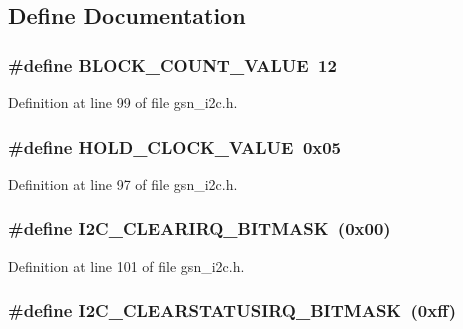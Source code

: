 \subsection{Define Documentation}
\hypertarget{a00516_aadd6c6fc61177e3aa132d309515f93fb}{
\subsubsection[{BLOCK\_\-COUNT\_\-VALUE}]{\setlength{\rightskip}{0pt plus 5cm}\#define BLOCK\_\-COUNT\_\-VALUE~12}}
\label{a00516_aadd6c6fc61177e3aa132d309515f93fb}


Definition at line 99 of file gsn\_\-i2c.h.

\hypertarget{a00516_a8d74e4c372da075d89cf1f067a056368}{
\subsubsection[{HOLD\_\-CLOCK\_\-VALUE}]{\setlength{\rightskip}{0pt plus 5cm}\#define HOLD\_\-CLOCK\_\-VALUE~0x05}}
\label{a00516_a8d74e4c372da075d89cf1f067a056368}


Definition at line 97 of file gsn\_\-i2c.h.

\hypertarget{a00516_aed890941c63a6b5ffef9e6d6858287f8}{
\subsubsection[{I2C\_\-CLEARIRQ\_\-BITMASK}]{\setlength{\rightskip}{0pt plus 5cm}\#define I2C\_\-CLEARIRQ\_\-BITMASK~(0x00)}}
\label{a00516_aed890941c63a6b5ffef9e6d6858287f8}


Definition at line 101 of file gsn\_\-i2c.h.

\hypertarget{a00516_a58947b4668e625ae55a8e9f3648ad78d}{
\subsubsection[{I2C\_\-CLEARSTATUSIRQ\_\-BITMASK}]{\setlength{\rightskip}{0pt plus 5cm}\#define I2C\_\-CLEARSTATUSIRQ\_\-BITMASK~(0xff)}}
\label{a00516_a58947b4668e625ae55a8e9f3648ad78d}


